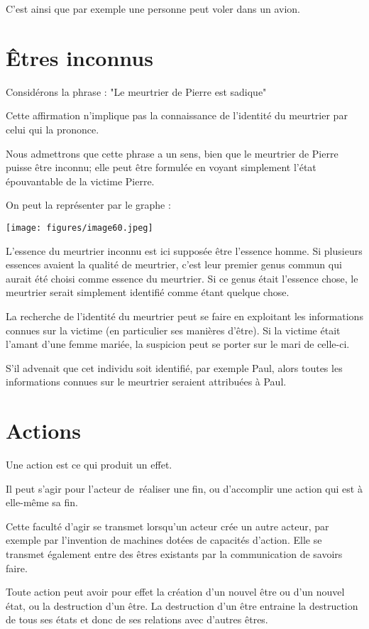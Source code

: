 \documentclass[a4paper, 12pt, openright, french]{book}
\makeatletter
\newcommand{\disableopenany}{%
	\@openrighttrue%
}
\makeatother
\begin{document}
C'est ainsi que par exemple une personne peut voler dans
un avion.


\raggedbottom
\chapter{Êtres inconnus}

Considérons la phrase : "Le meurtrier de Pierre est sadique"

Cette affirmation n'implique pas la connaissance de
l'identité du meurtrier par celui qui la prononce.

Nous admettrons que cette phrase a un sens, bien que le meurtrier de
Pierre puisse être inconnu; elle peut être formulée en voyant simplement l'état
épouvantable de la victime Pierre.

On peut la représenter par le graphe :

\texttt{[image: figures/image60.jpeg]}

L'essence du meurtrier inconnu est ici supposée être
l'essence homme. Si plusieurs essences avaient la
qualité de meurtrier, c'est leur premier genus commun
qui aurait été choisi comme essence du meurtrier. Si ce genus était
l'essence chose, le meurtrier serait simplement
identifié comme étant quelque chose.

La recherche de l'identité du meurtrier peut se faire en
exploitant les informations connues sur la victime (en particulier ses
manières d'être). Si la victime était
l'amant d'une femme mariée, la suspicion
peut se porter sur le mari de celle-ci.

S'il advenait que cet individu soit identifié, par
exemple Paul, alors toutes les informations connues sur le meurtrier
seraient attribuées à Paul.


\disableopenany
\chapter{Actions}

Une action est ce qui produit un effet.

Il peut s'agir pour l'acteur de~réaliser une fin, ou
d'accomplir une action qui est à elle-même sa fin.~

Cette faculté d'agir se transmet
lorsqu'un acteur crée un autre acteur, par exemple par
l'invention de machines dotées de capacités
d'action. Elle se transmet également entre des êtres
existants par la communication de savoirs faire.

Toute action peut avoir pour effet la création d'un
nouvel être ou d'un nouvel état, ou la destruction
d'un être. La destruction d'un être
entraine la destruction de tous ses états et donc de ses relations avec
d'autres êtres.
\end{document}

